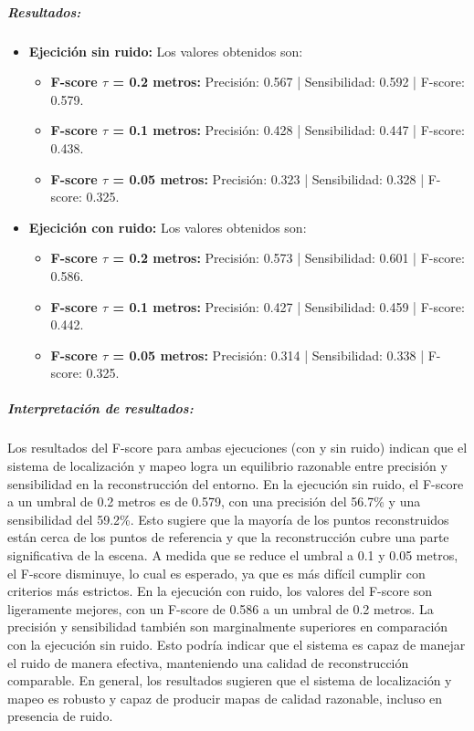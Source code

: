 \documentclass[12pt, a4paper, twoside]{article}
\begin{document}
\subparagraph{Resultados:}
\begin{itemize}
  \item \textbf{Ejecición sin ruido:} Los valores obtenidos son:
  \begin{itemize}
    \item \textbf{F-score\cite{Caccia2018FScore} \(\tau\) = 0.2 metros:} Precisión: 0.567 | Sensibilidad: 0.592 | F-score\cite{Caccia2018FScore}: 0.579.
    \item \textbf{F-score\cite{Caccia2018FScore} \(\tau\) = 0.1 metros:} Precisión: 0.428 | Sensibilidad: 0.447 | F-score\cite{Caccia2018FScore}: 0.438.
    \item \textbf{F-score\cite{Caccia2018FScore} \(\tau\) = 0.05 metros:} Precisión: 0.323 | Sensibilidad: 0.328 | F-score\cite{Caccia2018FScore}: 0.325.
  \end{itemize}
  \item \textbf{Ejecición con ruido:} Los valores obtenidos son:
  \begin{itemize}
    \item \textbf{F-score\cite{Caccia2018FScore} \(\tau\) = 0.2 metros:} Precisión: 0.573 | Sensibilidad: 0.601 | F-score\cite{Caccia2018FScore}: 0.586.
    \item \textbf{F-score\cite{Caccia2018FScore} \(\tau\) = 0.1 metros:} Precisión: 0.427 | Sensibilidad: 0.459 | F-score\cite{Caccia2018FScore}: 0.442.
    \item \textbf{F-score\cite{Caccia2018FScore} \(\tau\) = 0.05 metros:} Precisión: 0.314 | Sensibilidad: 0.338 | F-score\cite{Caccia2018FScore}: 0.325.
  \end{itemize}
\end{itemize}
\subparagraph{Interpretación de resultados:}
Los resultados del F-score\cite{Caccia2018FScore} para ambas ejecuciones (con y sin ruido) indican que el sistema de localización y mapeo logra un equilibrio razonable entre precisión y sensibilidad en la reconstrucción
del entorno.\newline
En la ejecución sin ruido, el F-score\cite{Caccia2018FScore} a un umbral de 0.2 metros es de 0.579, con una precisión del 56.7\% y una sensibilidad del 59.2\%. Esto sugiere que la mayoría de los puntos reconstruidos están
cerca de los puntos de referencia y que la reconstrucción cubre una parte significativa de la escena.
A medida que se reduce el umbral a 0.1 y 0.05 metros, el F-score\cite{Caccia2018FScore} disminuye, lo cual es esperado, ya que es más difícil cumplir con criterios más estrictos.\newline
En la ejecución con ruido, los valores del F-score\cite{Caccia2018FScore} son ligeramente mejores, con un F-score\cite{Caccia2018FScore} de 0.586 a un umbral de 0.2 metros. La precisión y sensibilidad también son marginalmente superiores en 
comparación con la ejecución sin ruido.
Esto podría indicar que el sistema es capaz de manejar el ruido de manera efectiva, manteniendo una calidad de reconstrucción comparable.\newline
En general, los resultados sugieren que el sistema de localización y mapeo es robusto y capaz de producir mapas de calidad razonable, incluso en presencia de ruido.
\end{document}
